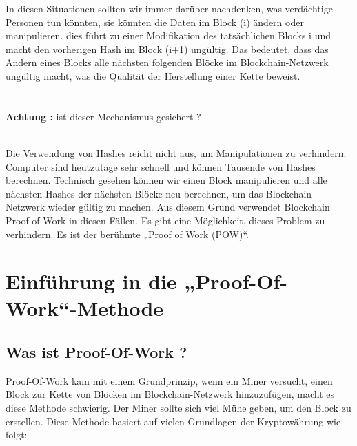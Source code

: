 \documentclass[ngerman]{scrreprt}
\begin{document}
In diesen Situationen sollten wir immer darüber nachdenken, was verdächtige Personen tun könnten, sie könnten die Daten im Block (i) ändern oder manipulieren.
dies führt zu einer Modifikation des tatsächlichen Blocks i und macht den vorherigen Hash im Block (i+1) ungültig. Das bedeutet, dass das Ändern eines Blocks alle nächsten folgenden Blöcke im Blockchain-Netzwerk ungültig macht, was die Qualität der Herstellung einer Kette beweist.\\ \\ \\ 
\color{red}
\huge{\textbf{Achtung :}}
\color{black}
\large
ist dieser Mechanismus gesichert ?\\ \\
\normalsize
 	
Die Verwendung von Hashes reicht nicht aus, um Manipulationen zu verhindern. Computer sind heutzutage sehr schnell und können Tausende von Hashes berechnen. Technisch gesehen können wir einen Block manipulieren und alle nächsten Hashes der nächsten Blöcke neu berechnen, um das Blockchain-Netzwerk wieder gültig zu machen. Aus diesem Grund verwendet Blockchain Proof of Work
in diesen Fällen. Es gibt eine Möglichkeit, dieses Problem zu verhindern. Es ist der berühmte „Proof of Work (POW)“.	








\chapter[Theoretische Seite der Proof-Of-Work-Methode]{Einführung in die „Proof-Of-Work“-Methode}	

\section{Was ist Proof-Of-Work ?}
Proof-Of-Work kam mit einem Grundprinzip, wenn ein Miner versucht, einen Block zur Kette von Blöcken im Blockchain-Netzwerk hinzuzufügen, macht es diese Methode schwierig. Der Miner sollte sich viel Mühe geben, um den Block zu erstellen. Diese Methode basiert auf vielen Grundlagen der Kryptowährung wie folgt:
\end{document}

